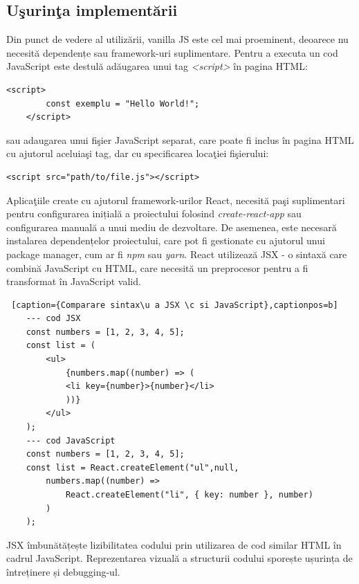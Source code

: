 \documentclass[12pt, a4paper]{report}
\begin{document}
\subsection{U\c surin\c ta implement\u arii}
Din punct de vedere al utiliz\u arii, vanilla JS este cel mai proeminent, deoarece nu necesit\u a dependențe sau framework-uri suplimentare. Pentru a executa un cod JavaScript este destul\u a ad\u augarea unui tag \textit{\textless script\textgreater }   \^ in pagina HTML:
\begin{lstlisting}[caption={Exemplu de ad\u augare a unui script \^ in pagina HTML},captionpos=b]
	<script>
		const exemplu = "Hello World!";
	</script>
	\end{lstlisting}

sau adaugarea unui fi\c sier JavaScript separat, care poate fi inclus \^ in pagina HTML cu ajutorul aceluia\c si tag, dar cu specificarea loca\c tiei fi\c sierului:

\begin{lstlisting}[caption={Exemplu de ad\u augare a unui script dintr-un fi\c sier extern},captionpos=b]
	<script src="path/to/file.js"></script>
\end{lstlisting}

Aplica\c tiile create cu ajutorul framework-urilor React, necesit\u a pa\c si suplimentari pentru configurarea inițială a proiectului folosind \textit{create-react-app} sau configurarea manuală a unui mediu de dezvoltare. De asemenea, este necesar\u a instalarea dependențelor proiectului, care pot fi gestionate cu ajutorul unui package manager, cum ar fi \textit{npm} sau \textit{yarn}. React utilizează JSX - o sintaxă care combină JavaScript cu HTML, care necesită un preprocesor pentru a fi transformat în JavaScript valid.

\begin{lstlisting} [caption={Comparare sintax\u a JSX \c si JavaScript},captionpos=b]
	--- cod JSX
	const numbers = [1, 2, 3, 4, 5];
	const list = (
		<ul>
			{numbers.map((number) => (
			<li key={number}>{number}</li>
			))}
		</ul>
	);
	--- cod JavaScript
	const numbers = [1, 2, 3, 4, 5];
	const list = React.createElement("ul",null,
		numbers.map((number) =>
			React.createElement("li", { key: number }, number)
		)
	);

\end{lstlisting}

JSX îmbunătățește lizibilitatea codului prin utilizarea de cod similar HTML în cadrul JavaScript. Reprezentarea vizuală a structurii codului sporește ușurința de întreținere și debugging-ul.
\end{document}
